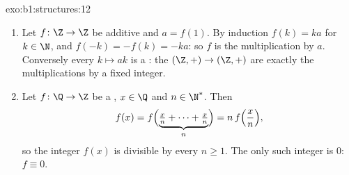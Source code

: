 \begin{solution}{exo:b1:structures:12}
\begin{enumerate}
  \item Let $f \colon \Z \to \Z$ be additive and $a = f(1)$. By
        induction $f(k) = ka$ for $k \in \N$, and $f(-k) = -f(k) =
        -ka$: so $f$ is the multiplication by $a$. Conversely
        every  $k \mapsto ak$ is a : the 
        $(\Z,+) \to (\Z,+)$ are exactly the multiplications by a
        fixed integer.
  \item Let $f \colon \Q \to \Z$ be a , $x \in \Q$ and
        $n \in \N^*$. Then
        \[
        f(x) = f\Bigl(\underbrace{\tfrac xn + \dots +
        \tfrac xn}_{n}\Bigr) = n\,f\Bigl(\frac xn\Bigr) ,
        \]
        so the integer $f(x)$ is divisible by every $n \geq 1$.
        The only such integer is $0$: $f \equiv 0$.
\end{enumerate}
\end{solution}

